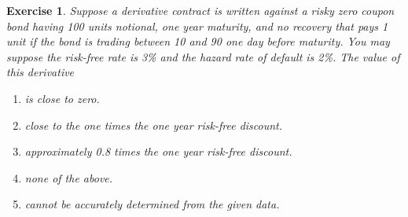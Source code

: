 \documentclass[11pt,fleqn]{amsproc}
\newtheorem{xca}{Exercise}
\begin{document}
\begin{xca}
Suppose a derivative contract is written against a risky zero coupon bond having 100 units notional, 
one year maturity, and no recovery 
that pays 1 unit if the bond is trading between 10 and 90 one day before maturity.
You may suppose the risk-free rate is 3\% and the hazard rate of default is 2\%.
The value of this derivative
\begin{enumerate}
\item is close to zero.
\item close to the one times the one year risk-free discount.
\item approximately 0.8 times the one year risk-free discount.
\item none of the above.
\item cannot be accurately determined from the given data.
\end{enumerate}
\end{xca}
\end{document}
